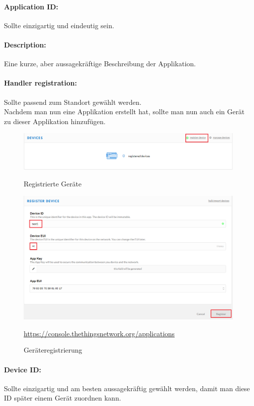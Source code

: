 \paragraph{Application ID:} Sollte einzigartig und eindeutig sein.
\paragraph{Description:} Eine kurze, aber aussagekräftige Beschreibung der Applikation.
\paragraph{Handler registration:} Sollte passend zum Standort gewählt werden.\\
Nachdem man nun eine Applikation erstellt hat, sollte man nun auch ein Gerät zu dieser Applikation hinzufügen.
\begin{figure}[ht]
    \center
    \includegraphics[width=16cm]{Bilder/lora-4.png}\\
    \caption{Registrierte Geräte}
\end{figure}
\begin{figure}[ht]
    \center
    \includegraphics[width=16cm]{Bilder/lora-5.png}\\
    \caption{Geräteregistrierung}
    \begin{center} \quelle\url{https://console.thethingsnetwork.org/applications} \end{center}
\end{figure}
\newpage
\paragraph{Device ID:} Sollte einzigartig und am besten aussagekräftig gewählt werden, damit man diese ID später einem Gerät zuordnen kann.

